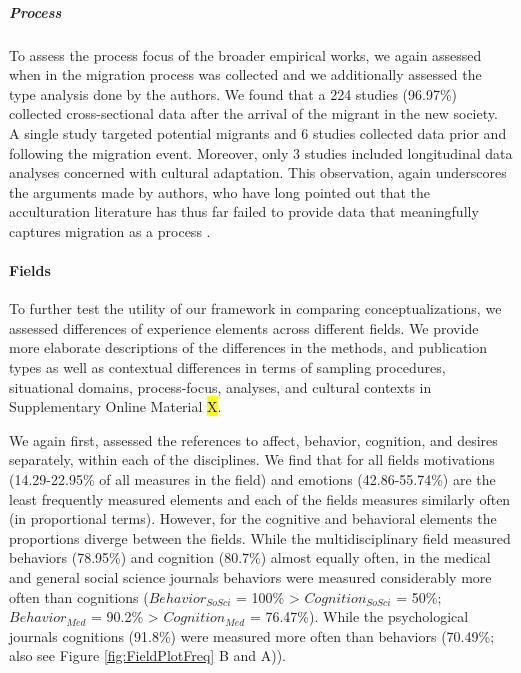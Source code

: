 \vspace{1em}

\subparagraph{Process}

To assess the process focus of the broader empirical works, we again
assessed when in the migration process was collected and we additionally
assessed the type analysis done by the authors. We found that a 224
studies (96.97\%) collected cross-sectional data after the arrival of
the migrant in the new society. A single study targeted potential
migrants and 6 studies collected data prior and following the migration
event. Moreover, only 3 studies included longitudinal data analyses
concerned with cultural adaptation. This observation, again underscores
the arguments made by authors, who have long pointed out that the
acculturation literature has thus far failed to provide data that
meaningfully captures migration as a process
\citep[e.g.,][]{Brown2011, Ward2019}.

\paragraph{Fields}

To further test the utility of our framework in comparing
conceptualizations, we assessed differences of experience elements
across different fields. We provide more elaborate descriptions of the
differences in the methods, and publication types as well as contextual
differences in terms of sampling procedures, situational domains,
process-focus, analyses, and cultural contexts in Supplementary Online
Material \hl{X}.

We again first, assessed the references to affect, behavior, cognition,
and desires separately, within each of the disciplines. We find that for
all fields motivations (14.29-22.95\% of all measures in the field) and
emotions (42.86-55.74\%) are the least frequently measured elements and
each of the fields measures similarly often (in proportional terms).
However, for the cognitive and behavioral elements the proportions
diverge between the fields. While the multidisciplinary field measured
behaviors (78.95\%) and cognition (80.7\%) almost equally often, in the
medical and general social science journals behaviors were measured
considerably more often than cognitions (\(Behavior_{SoSci}\) = 100\%
\textgreater{} \(Cognition_{SoSci}\) = 50\%; \(Behavior_{Med}\) = 90.2\%
\textgreater{} \(Cognition_{Med}\) = 76.47\%). While the psychological
journals cognitions (91.8\%) were measured more often than behaviors
(70.49\%; also see Figure \ref{fig:FieldPlotFreq} B and A)).

